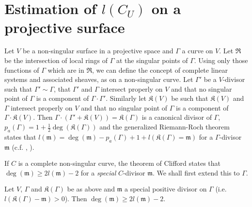 \section{Estimation of \texorpdfstring{$l(C_{U})$}{CU} on a projective surface}\label{art14-sec2}\pageoriginale

Let $V$ be a non-singular surface in a projective space and $\Gamma$ a curve on $V$. Let $\mathfrak{R}$ be the intersection of local rings of $\Gamma$ at the singular points of $\Gamma$. Using only those functions of $\Gamma$ which are in $\mathfrak{R}$, we can define the concept of complete linear systems and associated sheaves, as on a non-singular curve. Let $\Gamma'$ be a $V$-divisor such that $\Gamma'\sim \Gamma$, that $\Gamma'$ and $\Gamma$ intersect properly on $V$ and that no singular point of $\Gamma$ is a component of $\Gamma\cdot \Gamma'$. Similarly let $\mathfrak{K}(V)$ be such that $\mathfrak{K}(V)$ and $\Gamma$ intersect properly on $V$ and that no singular point of $\Gamma$ is a component of $\Gamma\cdot \mathfrak{K}(V)$. Then $\Gamma\cdot (\Gamma'+\mathfrak{K}(V))=\mathfrak{K}(\Gamma)$ is a canonical divisor of $\Gamma$, $p_{a}(\Gamma)=1+\frac{1}{2}\deg (\mathfrak{K}(\Gamma))$ and the generalized Riemann-Roch theorem states that $l(\mathfrak{m})=\deg (\mathfrak{m})-p_{a}(\Gamma)+1+l(\mathfrak{K}(\Gamma)=\mathfrak{m})$ for a $\Gamma$-divisor $\mathfrak{m}$ (c.f. \cite{art14-key20}, \cite{art14-key22}).

If $C$ is a complete non-singular curve, the theorem  of Clifford states that $\deg (\mathfrak{m})\geq 2l(\mathfrak{m})-2$ for a {\em special} $C$-divisor $\mathfrak{m}$. We shall first extend this to $\Gamma$.

\begin{lemma}\label{art14-lem2}
Let $V$, $\Gamma$ and $\mathfrak{K}(\Gamma)$ be as above and $\mathfrak{m}$ a special positive divisor on $\Gamma$ (i.e. $l(\mathfrak{K}(\Gamma)-\mathfrak{m})>0$). Then $\deg (\mathfrak{m})\geq 2l(\mathfrak{m})-2$.
\end{lemma}

